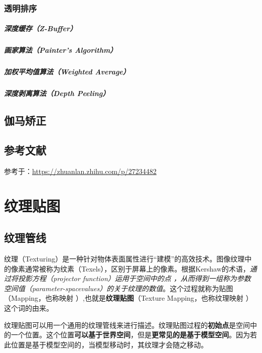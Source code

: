 \documentclass[UTF8,a4paper,12pt]{ctexbook}
\begin{document}
		\subsection{透明排序}
			\paragraph{深度缓存（Z-Buffer）}
			
			\paragraph{画家算法（Painter's Algorithm）}
			
			\paragraph{加权平均值算法（Weighted Average）}
			
			\paragraph{深度剥离算法（Depth Peeling）}

	\section{伽马矫正}
	
	\section{参考文献}
			参考于：\url{https://zhuanlan.zhihu.com/p/27234482}
	

	
			
\chapter{纹理贴图}
	\section{纹理管线}
		纹理（Texturing）是一种针对物体表面属性进行“建模”的高效技术。图像纹理中的像素通常被称为纹素（Texels），区别于屏幕上的像素。根据Kershaw的术语，\textit{通过将投影方程（projector function）运用于空间中的点 ，从而得到一组称为参数空间值（parameter-spacevalues）的关于纹理的数值}。这个过程就称为贴图（Mapping，也称映射 ）,也就是\textbf{纹理贴图}（Texture Mapping，也称纹理映射 ）这个词的由来。
		
		纹理贴图可以用一个通用的纹理管线来进行描述。纹理贴图过程的\textbf{初始点}是空间中的一个位置。这个位置\textbf{可以基于世界空间}，但是\textbf{更常见的是基于模型空间}。因为若此位置是基于模型空间的，当模型移动时，其纹理才会随之移动。
		
\end{document}
